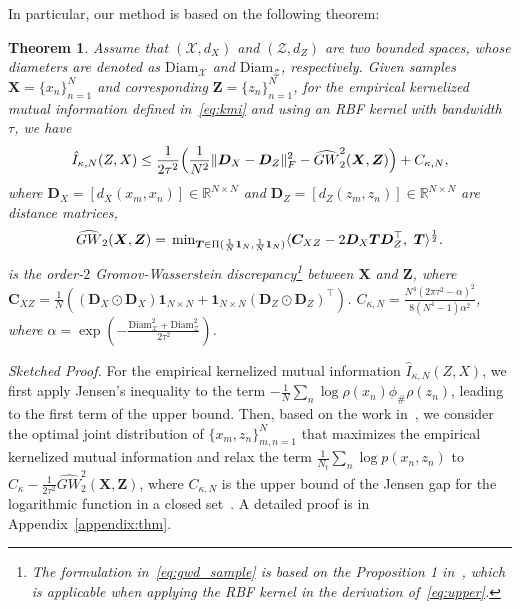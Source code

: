 \documentclass{article}
\newtheorem{theorem}{Theorem}
\begin{document}
In particular, our method is based on the following theorem:
\begin{theorem}\label{thm:upperbound}
    Assume that $(\mathcal{X},d_{X})$ and $(\mathcal{Z},d_Z)$ are two bounded spaces, whose diameters are denoted as $\text{Diam}_{\mathcal{X}}$ and $\text{Diam}_{\mathcal{Z}}$, respectively. 
    Given samples $\bm{X}=\{x_{n}\}_{n=1}^{N}$ and corresponding $\bm{Z}=\{z_n\}_{n=1}^N$, 
    for the empirical kernelized mutual information defined in~\eqref{eq:kmi} and using an RBF kernel with bandwidth $\tau$, we have
    \begin{eqnarray}\label{eq:upper}
        \hat{I}_{\kappa,N}(Z,X)\leq \frac{1}{2\tau^2}\Bigl(\frac{1}{N^2}\|\bm{D}_{X}-\bm{D}_{Z}\|_F^2 - \widehat{GW}_2^2(\bm{X},\bm{Z})\Bigr)+C_{\kappa,N},
    \end{eqnarray}
    where $\bm{D}_{X}=[d_X(x_{m},x_{n})]\in\mathbb{R}^{N\times N}$ and $\bm{D}_{Z}=[d_Z(z_{m},z_{n})]\in\mathbb{R}^{N\times N}$ are distance matrices, 
    \begin{eqnarray}\label{eq:gwd_sample}
        \widehat{GW}_2(\bm{X},\bm{Z})=\sideset{}{_{\bm{T}\in \Pi(\frac{1}{N}\bm{1}_{N},\frac{1}{N}\bm{1}_{N})}}\min\langle\bm{C}_{XZ}-2\bm{D}_{X}\bm{T}\bm{D}_{Z}^{\top},~\bm{T}\rangle^{\frac{1}{2}}.
    \end{eqnarray}
    is the order-$2$ Gromov-Wasserstein discrepancy\footnote{The formulation in~\eqref{eq:gwd_sample} is based on the Proposition 1 in~\cite{peyre2016gromov}, which is applicable when applying the RBF kernel in the derivation of~\eqref{eq:upper}.} between $\bm{X}$ and $\bm{Z}$, where $\bm{C}_{XZ}=\frac{1}{N}((\bm{D}_{X}\odot\bm{D}_{X})\bm{1}_{N\times N}+\bm{1}_{N\times N}(\bm{D}_{Z}\odot\bm{D}_{Z})^{\top})$.
    $C_{\kappa,N}=\frac{N^4(2\pi\tau^2-\alpha)^2}{8(N^4-1)\alpha^2}$, where $\alpha=\exp(-\frac{\text{Diam}^2_{\mathcal{X}}+\text{Diam}^2_{\mathcal{Z}}}{2\tau^2})$.
\end{theorem}
\textit{Sketched Proof.} For the empirical kernelized mutual information $\hat{I}_{\kappa,N}(Z,X)$, we first apply Jensen's inequality to the term $-\frac{1}{N}\sum_{n}\log \rho(x_{n})\phi_{\#}\rho(z_{n})$, leading to the first term of the upper bound.
Then, based on the work in~\cite{chuang2023infoot}, we consider the optimal joint distribution of $\{x_m, z_n\}_{m,n=1}^{N}$ that maximizes the empirical kernelized mutual information and relax the term $\frac{1}{N_t}\sum_{n}\log p(x_{n},z_{n})$ to $C_{\kappa}-\frac{1}{2\tau^2}\widehat{GW}_2^2(\bm{X},\bm{Z})$, where $C_{\kappa,N}$ is the upper bound of the Jensen gap for the logarithmic function in a closed set~\cite{costarelli2015sharp}. 
A detailed proof is in Appendix~\ref{appendix:thm}.
\end{document}
